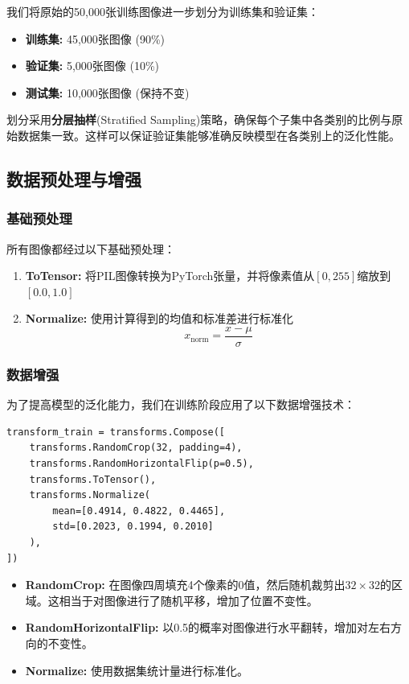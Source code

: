 \documentclass[12pt,a4paper]{article}
\begin{document}
我们将原始的50,000张训练图像进一步划分为训练集和验证集：
\begin{itemize}[leftmargin=2em]
    \item \textbf{训练集:} 45,000张图像 (90\%)
    \item \textbf{验证集:} 5,000张图像 (10\%)
    \item \textbf{测试集:} 10,000张图像 (保持不变)
\end{itemize}

划分采用\textbf{分层抽样}(Stratified Sampling)策略，确保每个子集中各类别的比例与原始数据集一致。这样可以保证验证集能够准确反映模型在各类别上的泛化性能。

\subsection{数据预处理与增强}

\subsubsection{基础预处理}

所有图像都经过以下基础预处理：
\begin{enumerate}[leftmargin=2em]
    \item \textbf{ToTensor:} 将PIL图像转换为PyTorch张量，并将像素值从$[0, 255]$缩放到$[0.0, 1.0]$
    \item \textbf{Normalize:} 使用计算得到的均值和标准差进行标准化
    \begin{equation}
        x_{\text{norm}} = \frac{x - \mu}{\sigma}
    \end{equation}
\end{enumerate}

\subsubsection{数据增强}

为了提高模型的泛化能力，我们在训练阶段应用了以下数据增强技术：

\begin{lstlisting}[caption={数据增强配置},label={lst:augmentation}]
transform_train = transforms.Compose([
    transforms.RandomCrop(32, padding=4),
    transforms.RandomHorizontalFlip(p=0.5),
    transforms.ToTensor(),
    transforms.Normalize(
        mean=[0.4914, 0.4822, 0.4465],
        std=[0.2023, 0.1994, 0.2010]
    ),
])
\end{lstlisting}

\begin{itemize}[leftmargin=2em]
    \item \textbf{RandomCrop:} 在图像四周填充4个像素的0值，然后随机裁剪出$32 \times 32$的区域。这相当于对图像进行了随机平移，增加了位置不变性。
    \item \textbf{RandomHorizontalFlip:} 以0.5的概率对图像进行水平翻转，增加对左右方向的不变性。
    \item \textbf{Normalize:} 使用数据集统计量进行标准化。
\end{itemize}
\end{document}
